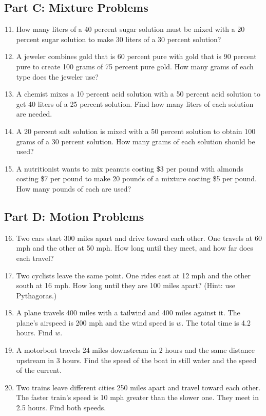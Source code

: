 \documentclass[14pt]{extarticle}
\begin{document}
\subsection*{Part C: Mixture Problems}
\begin{enumerate}
  \setcounter{enumi}{10}
  \item How many liters of a 40 percent sugar solution must be mixed with a 20 percent sugar solution to make 30 liters of a 30 percent solution?
  \item A jeweler combines gold that is 60 percent pure with gold that is 90 percent pure to create 100 grams of 75 percent pure gold. How many grams of each type does the jeweler use?
  \item A chemist mixes a 10 percent acid solution with a 50 percent acid solution to get 40 liters of a 25 percent solution. Find how many liters of each solution are needed.
  \item A 20 percent salt solution is mixed with a 50 percent solution to obtain 100 grams of a 30 percent solution. How many grams of each solution should be used?
  \item A nutritionist wants to mix peanuts costing \$3 per pound with almonds costing \$7 per pound to make 20 pounds of a mixture costing \$5 per pound. How many pounds of each are used?
\end{enumerate}

\subsection*{Part D: Motion Problems}
\begin{enumerate}
  \setcounter{enumi}{15}
  \item Two cars start 300 miles apart and drive toward each other. One travels at 60 mph and the other at 50 mph. How long until they meet, and how far does each travel?
  \item Two cyclists leave the same point. One rides east at 12 mph and the other south at 16 mph. How long until they are 100 miles apart? (Hint: use Pythagoras.)
  \item A plane travels 400 miles with a tailwind and 400 miles against it. The plane’s airspeed is 200 mph and the wind speed is \(w\). The total time is 4.2 hours. Find \(w\).
  \item A motorboat travels 24 miles downstream in 2 hours and the same distance upstream in 3 hours. Find the speed of the boat in still water and the speed of the current.
  \item Two trains leave different cities 250 miles apart and travel toward each other. The faster train’s speed is 10 mph greater than the slower one. They meet in 2.5 hours. Find both speeds.
\end{enumerate}
\end{document}
